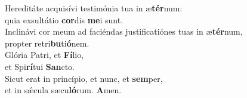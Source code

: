 \oddverse Hereditáte acquisívi testimónia tua in æ\textbf{tér}num:~\*\\
\oddverse quia exsultátio \textbf{cor}dis \textbf{me}i sunt.\\
\evenverse Inclinávi cor meum ad faciéndas justificatiónes tuas in æ\textbf{tér}num,~\*\\
\evenverse propter retri\textbf{bu}ti\textbf{ó}nem.\\
\oddverse Glória Patri, et \textbf{Fí}lio,~\*\\
\oddverse et Spi\textbf{rí}tui \textbf{San}cto.\\
\evenverse Sicut erat in princípio, et nunc, et \textbf{sem}per,~\*\\
\evenverse et in sǽcula sæcu\textbf{ló}rum. \textbf{A}men.\\
